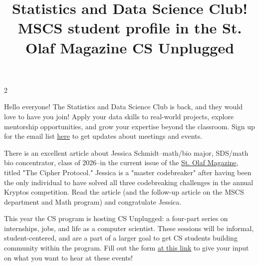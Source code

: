 \documentclass[12pt]{article}
\newcommand{\bolder}{\textbf}
\begin{document}
\begin{multicols}{2}
\begin{tcolorbox}[colback=white, colframe=black]
    \begin{center}
    \title{{\large \bolder{Statistics and Data Science Club!
}}}
    \end{center}
\end{tcolorbox}

Hello everyone! The Statistics and Data Science Club is back, and they would love to have you join! Apply your data skills to real-world projects, explore mentorship opportunities, and grow your expertise beyond the classroom. Sign up for the email list \href{https://docs.google.com/forms/d/e/1FAIpQLSeV00ldRadWwtvfA8nmOIuL43iZ0MFHp6O5cmrPY5HAsxVJMQ/viewform}{here} to get updates about meetings and events. 


\begin{tcolorbox}[colback=white, colframe=black]
    \begin{center}
    \title{{\large \bolder{MSCS student profile in the St. Olaf Magazine
}}}
    \end{center}
\end{tcolorbox}

There is an excellent article about Jessica Schmidt--math/bio major, SDS/math bio concentrator, class of 2026--in the current issue of the \href{https://wp.stolaf.edu/magazine/}{St. Olaf Magazine}, titled "The Cipher Protocol." Jessica is a "master codebreaker" after having been the only individual to have solved all three codebreaking challenges in the annual Kryptos competition. Read the article (and the follow-up article on the MSCS department and Math program) and congratulate Jessica.



\begin{tcolorbox}[colback=white, colframe=black]
    \begin{center}
    \title{{\large \bolder{ CS Unplugged   }}}
    \end{center}
\end{tcolorbox}

This year the CS program is hosting CS Unplugged: a four-part series on internships, jobs, and life as a computer scientist. These sessions will be informal, student-centered, and are a part of a larger goal to get CS students building community within the program. Fill out the form \href{https://docs.google.com/forms/d/e/1FAIpQLScfAnexFhdd-ZAHY0RDX8MpB6A7D7cFtjFYITs-VHnXKzg8XQ/viewform}{at this link} to give your input on what you want to hear at these events!


\end{multicols}
\end{document}
